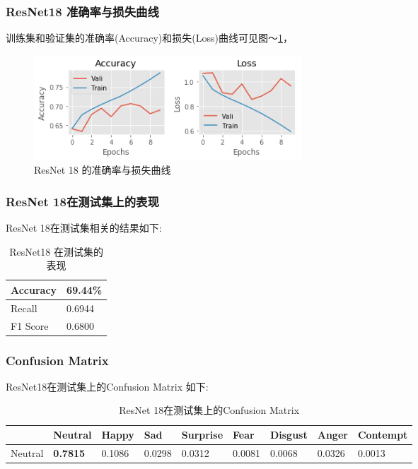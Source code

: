 \documentclass[11pt, a4paper]{article}
\begin{document}
\begin{CJK}{UTF8}{gbsn}
\subsubsection{ResNet18 准确率与损失曲线}

训练集和验证集的准确率(Accuracy)和损失(Loss)曲线可见图～\ref{fig:res18_loss}，

\begin{figure}[htbp]
	\centering %
	
	\includegraphics[width=10cm]{res18}
	\caption{ResNet 18 的准确率与损失曲线}
	\label{fig:res18_loss}
\end{figure}

\subsubsection{ResNet 18在测试集上的表现}

ResNet 18在测试集相关的结果如下:

\begin{table}[htbp] 
	\begin{center}
		\caption{ResNet18 在测试集的表现}
		\begin{tabular}{l | l}  \hline
			Accuracy  &  69.44\%  \\ \hline
			Recall        &  0.6944 \\ \hline
			F1 Score    & 0.6800 \\ \hline
		\end{tabular}
		\label{tab:res18_test}
	\end{center}
\end{table}	


\subsubsection{Confusion Matrix}

ResNet18在测试集上的Confusion Matrix 如下:

\begin{table}[htbp] 
	\begin{center}
		\caption{ResNet 18在测试集上的Confusion Matrix}
		\begin{tabular}{ | l | l | l | l | l |l | l |l | l | }  \hline
			&  Neutral  & Happy & Sad   &  Surprise   &  Fear  & Disgust  & Anger & Contempt  \\ \hline
			Neutral  & \textbf{0.7815}   & 0.1086  & 0.0298  & 0.0312  & 0.0081  &  0.0068  &  0.0326 & 0.0013 \\ \hline
			

\end{tabular}
\end{center}
\end{table}
\end{CJK}
\end{document}

